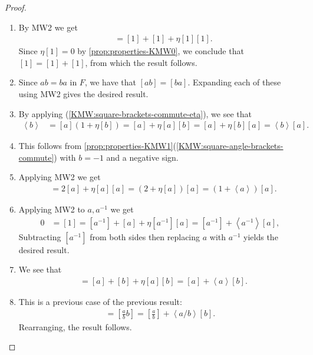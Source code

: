 \documentclass[11pt,openany]{book}
\begin{document}
\begin{proof} $\ $
\begin{enumerate}
    \item By MW2 we get
    \begin{align*}
        [1\cdot 1] &= [1] + [1] + \eta[1][1].
    \end{align*}
    Since $\eta[1] = 0$ by \autoref{prop:properties-KMW0}, we conclude that $[1] = [1] + [1]$, from which the result follows.
    
    \item Since $ab=ba$ in $F$, we have that $[ab] = [ba]$. Expanding each of these using MW2 gives the desired result.

    \item By applying (\ref{KMW:square-brackets-commute-eta}), we see that
    \begin{align*}
        [a] \left\langle b \right\rangle &= [a] \left( 1 + \eta[b] \right) = [a] + \eta[a][b] = [a] + \eta[b][a] = \left\langle b \right\rangle[a].
    \end{align*}

    \item This follows from \autoref{prop:properties-KMW1}(\ref{KMW:square-angle-brackets-commute}) with $b=-1$ and a negative sign.
    

    \item Applying MW2 we get
    \begin{align*}
        [a^2] &= 2[a] + \eta[a][a] = (2+\eta[a])[a] = (1 + \left\langle a \right\rangle)[a].
    \end{align*}
    \item Applying MW2 to $a,a^{-1}$ we get
    \begin{align*}
        0 &=  [1] = [a^{-1}] + [a] + \eta[a^{-1}][a] = [a^{-1}] + \left\langle a^{-1} \right\rangle[a],
    \end{align*}
    Subtracting $[a^{-1}]$ from both sides then replacing $a$ with $a^{-1}$ yields the desired result.
    

    \item We see that
    \begin{align*}
        [ab] &= [a] + [b] + \eta[a][b] = [a] + \left\langle a \right\rangle[b].
    \end{align*}
    
    \item This is a previous case of the previous result:
    \begin{align*}
        [a] = \left[ \frac{a}{b}b \right] = \left[ \frac{a}{b} \right] + \left\langle a/b \right\rangle [b].
    \end{align*}
    Rearranging, the result follows.
\end{enumerate}
\end{proof}
\end{document}
